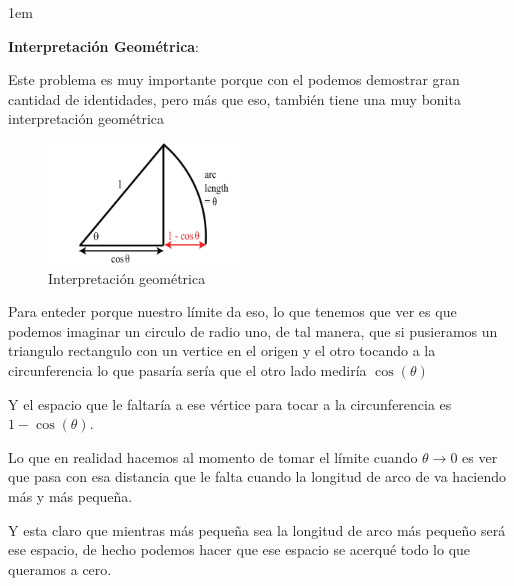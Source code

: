 \documentclass[12pt, fleqn]{report}                             %
\newenvironment{SmallIndentation}[1][0.75em]                    %
        {\begin{adjustwidth}{#1}{}\begin{footnotesize}}             %
        {\end{footnotesize}\end{adjustwidth}}                       %
\theoremstyle{break}                                            %
\newcommand{\Wrap}[1]           {\left( #1 \right)}             %
\newcommand{\Cos}[1] {\cos\Wrap{#1}}                            %
\begin{document}
                \clearpage
                \begin{SmallIndentation}[1em]
                    \textbf{Interpretación Geométrica}:


                    Este problema es muy importante porque con el podemos demostrar gran cantidad
                    de identidades, pero más que eso, también tiene una muy bonita interpretación
                    geométrica

                    \begin{figure}[h]
                        \centering
                        \includegraphics[width=0.45\textwidth]{LimCos-1}
                        \caption{Interpretación geométrica}
                    \end{figure}

                    Para enteder porque nuestro límite da eso, lo que tenemos que ver es
                    que podemos imaginar un circulo de radio uno, de tal manera, que si pusieramos
                    un triangulo rectangulo con un vertice en el origen y el otro tocando a la
                    circunferencia lo que pasaría sería que el otro lado mediría $\Cos{\theta}$

                    Y el espacio que le faltaría a ese vértice para tocar a la circunferencia es
                    $1-\Cos{\theta}$.

                    Lo que en realidad hacemos al momento de tomar el límite cuando $\theta \to 0$
                    es ver que pasa con esa distancia que le falta cuando la longitud de arco
                    de va haciendo más y más pequeña.

                    Y esta claro que mientras más pequeña sea la longitud de arco más pequeño será ese
                    espacio, de hecho podemos hacer que ese espacio se acerqué todo lo que queramos
                    a cero.  
                
                \end{SmallIndentation}
                    
\end{document}
